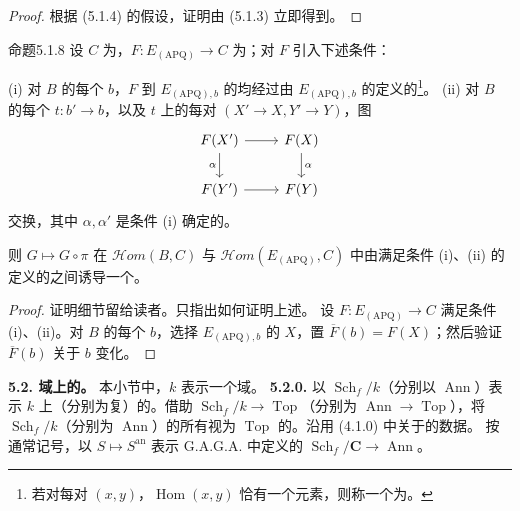 \begin{proof}
根据 (5.1.4) 的假设，证明由 (5.1.3) 立即得到。
\end{proof}
\begin{SGAresult}{命题}{5.1.8}
设 $C$ 为，$F:E_{(\mathrm{APQ})}\to C$ 为；对 $F$ 引入下述条件：

(i) 对 $B$ 的每个 $b$，$F$ 到 $E_{(\mathrm{APQ}),b}$ 的均经过由 $E_{(\mathrm{APQ}),b}$ 的定义的\footnote{若对每对 $(x,y)$，$\operatorname{Hom}(x,y)$ 恰有一个元素，则称一个为。}。
(ii) 对 $B$ 的每个 $t:b'\to b$，以及 $t$ 上的每对 $(X'\to X,Y'\to Y)$，图
\[
\begin{tikzcd}
F(X')\arrow[r]\arrow[d,"\alpha"']&F(X)\arrow[d,"\alpha"]\\
F(Y')\arrow[r]&F(Y)
\end{tikzcd}
\]
交换，其中 $\alpha,\alpha'$ 是条件 (i) 确定的。

则 $G\mapsto G\circ\pi$ 在 $\mathcal{H}om(B,C)$ 与 $\mathcal{H}om(E_{(\mathrm{APQ})},C)$ 中由满足条件 (i)、(ii) 的定义的之间诱导一个。
\end{SGAresult}
\begin{proof}
证明细节留给读者。只指出如何证明上述。
设 $F:E_{(\mathrm{APQ})}\to C$ 满足条件 (i)、(ii)。对 $B$ 的每个 $b$，选择 $E_{(\mathrm{APQ}),b}$ 的 $X$，置 $\overline F(b)=F(X)$；然后验证 $\overline F(b)$ 关于 $b$ 变化。
\end{proof}

\textbf{5.2. 域上的。} 本小节中，$k$ 表示一个域。
\textbf{5.2.0.} 以 $\operatorname{Sch}_f/k$（分别以 $\operatorname{Ann}$）表示 $k$ 上（分别为复）的。借助 $\operatorname{Sch}_f/k\to\operatorname{Top}$（分别为 $\operatorname{Ann}\to\operatorname{Top}$），将 $\operatorname{Sch}_f/k$（分别为 $\operatorname{Ann}$）的所有视为 $\operatorname{Top}$ 的。沿用 (4.1.0) 中关于的数据。
按通常记号，以 $S\mapsto S^{\mathrm{an}}$ 表示 G.A.G.A. 中定义的 $\operatorname{Sch}_f/\mathbf C\to\operatorname{Ann}$。

